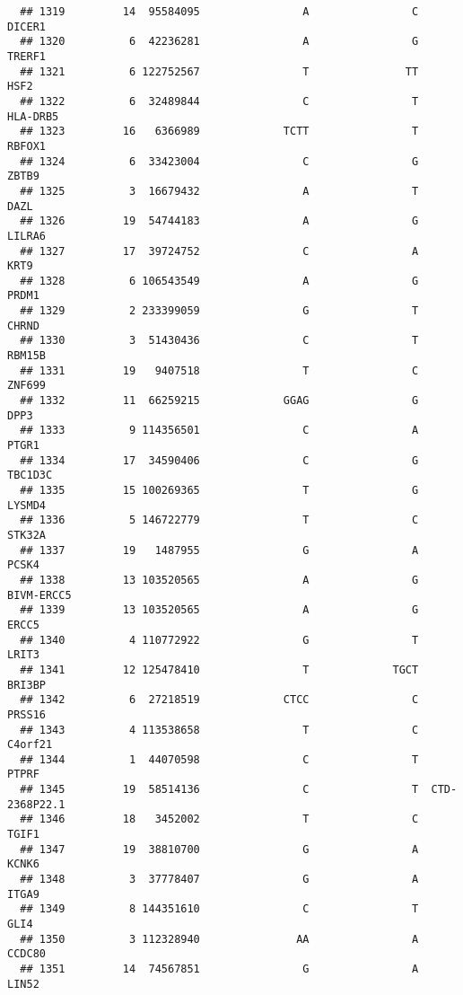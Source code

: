 \documentclass[12pt,twoside]{reedthesis}
\theoremstyle{definition}
\theoremstyle{definition}
\theoremstyle{remark}
\begin{document}
\begin{verbatim}
  ## 1319         14  95584095                A                C         DICER1
  ## 1320          6  42236281                A                G         TRERF1
  ## 1321          6 122752567                T               TT           HSF2
  ## 1322          6  32489844                C                T       HLA-DRB5
  ## 1323         16   6366989             TCTT                T         RBFOX1
  ## 1324          6  33423004                C                G          ZBTB9
  ## 1325          3  16679432                A                T           DAZL
  ## 1326         19  54744183                A                G         LILRA6
  ## 1327         17  39724752                C                A           KRT9
  ## 1328          6 106543549                A                G          PRDM1
  ## 1329          2 233399059                G                T          CHRND
  ## 1330          3  51430436                C                T         RBM15B
  ## 1331         19   9407518                T                C         ZNF699
  ## 1332         11  66259215             GGAG                G           DPP3
  ## 1333          9 114356501                C                A          PTGR1
  ## 1334         17  34590406                C                G        TBC1D3C
  ## 1335         15 100269365                T                G         LYSMD4
  ## 1336          5 146722779                T                C         STK32A
  ## 1337         19   1487955                G                A          PCSK4
  ## 1338         13 103520565                A                G     BIVM-ERCC5
  ## 1339         13 103520565                A                G          ERCC5
  ## 1340          4 110772922                G                T          LRIT3
  ## 1341         12 125478410                T             TGCT         BRI3BP
  ## 1342          6  27218519             CTCC                C         PRSS16
  ## 1343          4 113538658                T                C        C4orf21
  ## 1344          1  44070598                C                T          PTPRF
  ## 1345         19  58514136                C                T  CTD-2368P22.1
  ## 1346         18   3452002                T                C          TGIF1
  ## 1347         19  38810700                G                A          KCNK6
  ## 1348          3  37778407                G                A          ITGA9
  ## 1349          8 144351610                C                T           GLI4
  ## 1350          3 112328940               AA                A         CCDC80
  ## 1351         14  74567851                G                A          LIN52

\end{verbatim}
\end{document}
